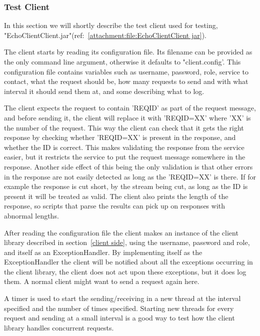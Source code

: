 \subsubsection{Test Client}\label{Testing:About:Client}
    In this section we will shortly describe the test client used for testing, "EchoClientClient.jar"(ref:~\ref{attachment:file:EchoClientClient jar}).

    The client starts by reading its configuration file. Its filename can be provided as the only command line argument, otherwise it defaults to "client.config'. This configuration file contains variables such as username, password, role, service to contact, what the request should be, how many requests to send and with what interval it should send them at, and some describing what to log.

    The client expects the request to contain '{REQID}' as part of the request message, and before sending it, the client will replace it with '{REQID=XX}' where 'XX' is the number of the request. This way the client can check that it gets the right response by checking whether '{REQID=XX}' is present in the response, and whether the ID is correct. This makes validating the response from the service easier, but it restricts the service to put the request message somewhere in the response. Another side effect of this being the only validation is that other errors in the response are not easily detected as long as the '{REQID=XX}' is there. If for example the response is cut short, by the stream being cut, as long as the ID is present it will be treated as valid. The client also prints the length of the response, so scripts that parse the results can pick up on responses with abnormal lengths.

    After reading the configuration file the client makes an instance of the client library described in section~\ref{client side}, using the username, password and role, and itself as an ExceptionHandler. By implementing itself as the ExceptionHandler the client will be notified about all the exceptions occurring in the client library, the client does not act upon these exceptions, but it does log them. A normal client might want to send a request again here.
    
    A timer is used to start the sending/receiving in a new thread at the interval specified and the number of times specified. Starting new threads for every request and sending at a small interval is a good way to test how the client library handles concurrent requests.

